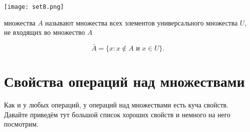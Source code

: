 \documentclass[12pt, a4paper]{article}
\begin{document}
\begin{center}
    \texttt{[image: set8.png]}
\end{center}


\begin{mydef}
 множества $A$ называют множества всех элементов универсального множества $U$, не входящих во множество $A$

\[\bar{A} = \{x: x \notin A \text{ и } x \in U \}.\]
\end{mydef}


\section{Свойства операций над множествами} 

Как и у любых операций, у операций над множествами есть куча свойств. Давайте приведём тут большой список хороших свойств и немного на него посмотрим. 
\end{document}

